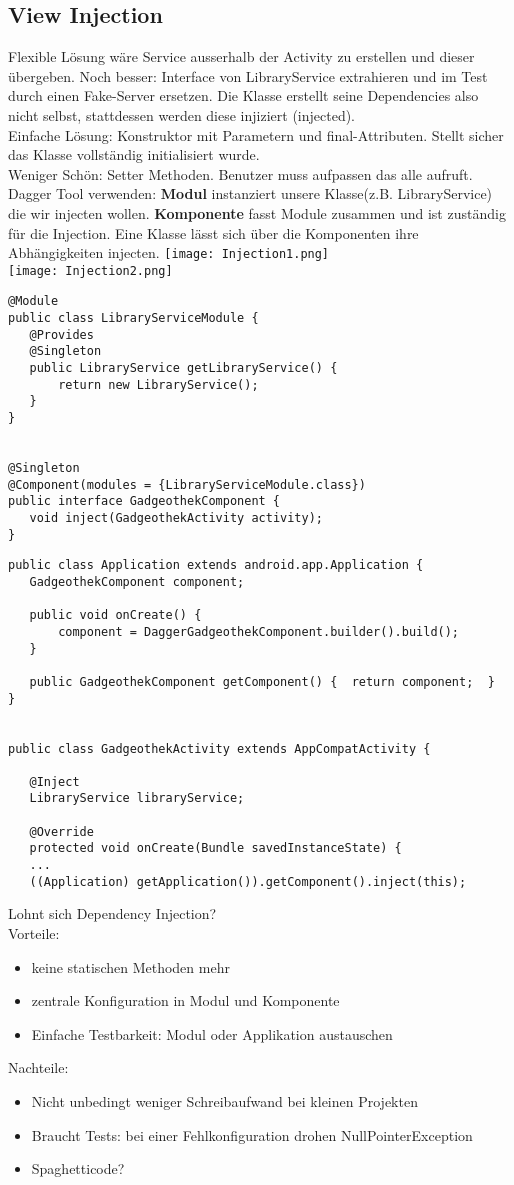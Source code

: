 \subsection{View Injection}
Flexible Lösung wäre Service ausserhalb der Activity zu erstellen und dieser übergeben. Noch besser: Interface von LibraryService extrahieren und im Test durch einen Fake-Server ersetzen. Die Klasse erstellt seine Dependencies also nicht selbst, stattdessen werden diese injiziert (injected). \\
Einfache Lösung: Konstruktor mit Parametern und final-Attributen. Stellt sicher das Klasse vollständig initialisiert wurde. \\
Weniger Schön: Setter Methoden. Benutzer muss aufpassen das alle aufruft. \\
Dagger Tool verwenden: \textbf{Modul} instanziert unsere Klasse(z.B. LibraryService) die wir injecten wollen. \textbf{Komponente} fasst Module zusammen und ist zuständig für die Injection. Eine Klasse lässt sich über die Komponenten ihre Abhängigkeiten injecten.
\texttt{[image: Injection1.png]} \\
\texttt{[image: Injection2.png]}
\begin{lstlisting}
@Module
public class LibraryServiceModule {
   @Provides
   @Singleton
   public LibraryService getLibraryService() {
       return new LibraryService();
   }
}


@Singleton
@Component(modules = {LibraryServiceModule.class})
public interface GadgeothekComponent {
   void inject(GadgeothekActivity activity);
}
\end{lstlisting}
\begin{lstlisting}
public class Application extends android.app.Application {
   GadgeothekComponent component;

   public void onCreate() {
       component = DaggerGadgeothekComponent.builder().build();
   }

   public GadgeothekComponent getComponent() {  return component;  }
}


public class GadgeothekActivity extends AppCompatActivity {

   @Inject
   LibraryService libraryService;

   @Override
   protected void onCreate(Bundle savedInstanceState) {
   ...
   ((Application) getApplication()).getComponent().inject(this);
\end{lstlisting}
Lohnt sich Dependency Injection? \\
Vorteile:
\begin{itemize}
\item keine statischen Methoden mehr
\item zentrale Konfiguration in Modul und Komponente
\item Einfache Testbarkeit: Modul oder Applikation austauschen
\end{itemize}
Nachteile:
\begin{itemize}
\item Nicht unbedingt weniger Schreibaufwand bei kleinen Projekten
\item Braucht Tests: bei einer Fehlkonfiguration drohen NullPointerException
\item Spaghetticode?
\end{itemize}
